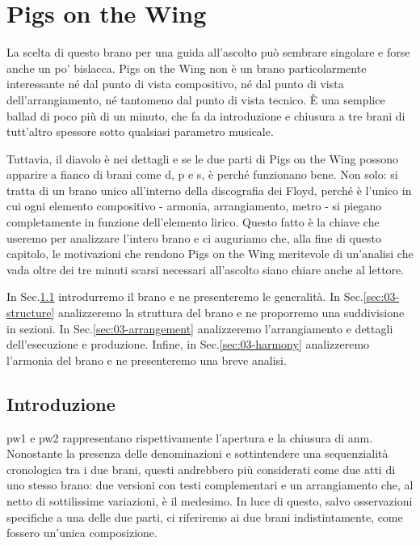 \documentclass[class=book, crop=false, oneside, 12pt]{standalone}
\begin{document}
    \chapter{Pigs on the Wing}
    \label{ch:03-pigs}
    La scelta di questo brano per una guida all'ascolto può sembrare singolare e forse anche un po' bislacca. Pigs on the Wing non è un brano particolarmente interessante né dal punto di vista compositivo, né dal punto di vista dell'arrangiamento, né tantomeno dal punto di vista tecnico. È una semplice ballad di poco più di un minuto, che fa da introduzione e chiusura a tre brani di tutt'altro spessore sotto qualsiasi parametro musicale.

    Tuttavia, il diavolo è nei dettagli e se le due parti di Pigs on the Wing possono apparire a fianco di brani come \acrshort{d}, \acrshort{p} e \acrshort{s}, è perché funzionano bene. Non solo: si tratta di un brano unico all'interno della discografia dei Floyd, perché è l'unico in cui ogni elemento compositivo - armonia, arrangiamento, metro - si piegano completamente in funzione dell'elemento lirico. Questo fatto è la chiave che useremo per analizzare l'intero brano e ci auguriamo che, alla fine di questo capitolo, le motivazioni che rendono Pigs on the Wing meritevole di un'analisi che vada oltre dei tre minuti scarsi necessari all'ascolto siano chiare anche al lettore.

    In Sec.\ref{sec:03-intro} introdurremo il brano e ne presenteremo le generalità. In Sec.\ref{sec:03-structure} analizzeremo la struttura del brano e ne proporremo una suddivisione in sezioni. In Sec.\ref{sec:03-arrangement} analizzeremo l'arrangiamento e dettagli dell'esecuzione e produzione. Infine, in Sec.\ref{sec:03-harmony} analizzeremo l'armonia del brano e ne presenteremo una breve analisi.

    \section{Introduzione}
    \label{sec:03-intro}
    \acrfull{pw1} e \acrfull{pw2} rappresentano rispettivamente l'apertura e la chiusura di \acrshort{anm}. Nonostante la presenza delle denominazioni  e  sottintendere una sequenzialità cronologica tra i due brani, questi andrebbero più considerati come due atti di uno stesso brano: due versioni con testi complementari e un arrangiamento che, al netto di sottilissime variazioni, è il medesimo. In luce di questo, salvo osservazioni specifiche a una delle due parti, ci riferiremo ai due brani indistintamente, come fossero un'unica composizione.
\end{document}
